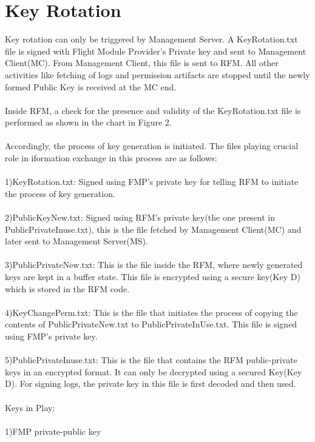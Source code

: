 \documentclass[18pt]{article}
\begin{document}
\section{Key Rotation}
Key rotation can only be triggered by Management Server. A KeyRotation.txt file is signed with Flight Module Provider's Private key and sent to Management Client(MC). From Management Client, this file is sent to RFM. All other activities like fetching of logs and permission artifacts are stopped until the newly formed Public Key is received at the MC end.\\
\\
Inside RFM, a check for the presence and validity of the KeyRotation.txt file is performed as shown in the chart in Figure 2.\\
\\
Accordingly, the process of key generation is initiated. The files playing crucial role in iformation exchange in this process are as follows:\\
\\
1)KeyRotation.txt: Signed using FMP's private key for telling RFM to initiate the process of key generation.\\
\\
2)PublicKeyNew.txt: Signed using RFM's private key(the one present in  PublicPrivateInuse.txt), this is the file fetched by Management Client(MC) and later sent to Management Server(MS).\\
\\
3)PublicPrivateNew.txt: This is the file inside the RFM, where newly generated keys are kept in a buffer state. This file is encrypted using a secure key(Key D) which is stored in the RFM code.\\
\\
4)KeyChangePerm.txt: This is the file that initiates the process of copying the contents of PublicPrivateNew.txt to PublicPrivateInUse.txt. This file is signed using FMP's private key.\\
\\
5)PublicPrivateInuse.txt: This is the file that contains the RFM public-private keys in an encrypted format. It can only be decrypted using a secured Key(Key D). For signing logs, the private key in this file is first decoded and then used.\\
\\
Keys in Play:\\
\\
1)FMP private-public key\\
\\
\end{document}
